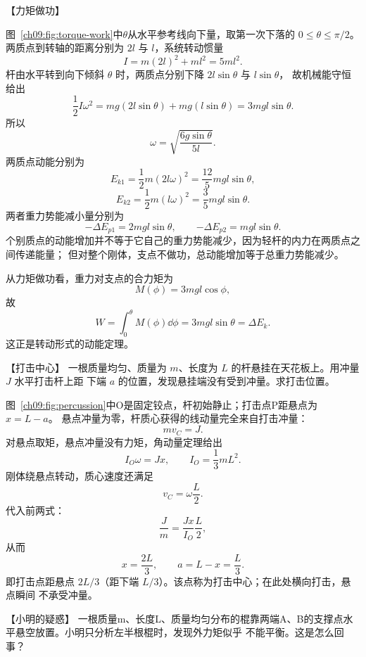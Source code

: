 {\begin{origexamplebox}{【力矩做功】}
\ThQRodWork
\end{origexamplebox}

\begin{xesolution}
\torqueWorkDiagram

图~\ref{ch09:fig:torque-work}中$\theta$从水平参考线向下量，取第一次下落的 $0\le\theta\le\pi/2$。
两质点到转轴的距离分别为 $2l$ 与 $l$，系统转动惯量
\[
 I=m(2l)^2+ml^2=5ml^2.
\]
杆由水平转到向下倾斜 $\theta$ 时，两质点分别下降 $2l\sin\theta$ 与 $l\sin\theta$，
故机械能守恒给出
\[
 \frac12I\omega^2=mg(2l\sin\theta)+mg(l\sin\theta)=3mgl\sin\theta.
\]
所以
\[
 \boxed{\omega=\sqrt{\frac{6g\sin\theta}{5l}}}.
\]
两质点动能分别为
\[
 \boxed{E_{k1}=\frac12m(2l\omega)^2
 =\frac{12}{5}mgl\sin\theta},
\]
\[
 \boxed{E_{k2}=\frac12m(l\omega)^2
 =\frac35mgl\sin\theta}.
\]
两者重力势能减小量分别为
\[
 \boxed{-\Delta E_{p1}=2mgl\sin\theta},
 \qquad
 \boxed{-\Delta E_{p2}=mgl\sin\theta}.
\]
个别质点的动能增加并不等于它自己的重力势能减少，因为轻杆的内力在两质点之间传递能量；
但对整个刚体，支点不做功，总动能增加等于总重力势能减少。

从力矩做功看，重力对支点的合力矩为
\[
 M(\phi)=3mgl\cos\phi,
\]
故
\[
 W=\int_0^\theta M(\phi)\dd\phi
 =3mgl\sin\theta=\Delta E_k.
\]
这正是转动形式的动能定理。
\end{xesolution}

\begin{origexamplebox}{【打击中心】}\label{ch09:ex:s17-15-9}
一根质量均匀、质量为 $m$、长度为 $L$ 的杆悬挂在天花板上。用冲量 $J$ 水平打击杆上距
下端 $a$ 的位置，发现悬挂端没有受到冲量。求打击位置。


\ThQPercussion
\end{origexamplebox}

\begin{xesolution}
\percussionDiagram

图~\ref{ch09:fig:percussion}中O是固定铰点，杆初始静止；打击点P距悬点为 $x=L-a$。
悬点冲量为零，杆质心获得的线动量完全来自打击冲量：
\[
 mv_C=J.
\]
对悬点取矩，悬点冲量没有力矩，角动量定理给出
\[
 I_O\omega=Jx,
 \qquad I_O=\frac13mL^2.
\]
刚体绕悬点转动，质心速度还满足
\[
 v_C=\omega\frac L2.
\]
代入前两式：
\[
 \frac Jm=\frac{Jx}{I_O}\frac L2,
\]
从而
\[
 \boxed{x=\frac{2L}{3}},
 \qquad
 \boxed{a=L-x=\frac L3}.
\]
即打击点距悬点 $2L/3$（距下端 $L/3$）。该点称为打击中心；在此处横向打击，悬点瞬间
不承受冲量。
\end{xesolution}

\begin{origexamplebox}{【小明的疑惑】}\label{ch09:ex:s17-15-10}
一根质量m、长度L、质量均匀分布的棍靠两端A、B的支撑点水平悬空放置。小明只分析左半根棍时，发现外力矩似乎
不能平衡。这是怎么回事？
\supportedRodProblemDiagram
\end{origexamplebox}

}
